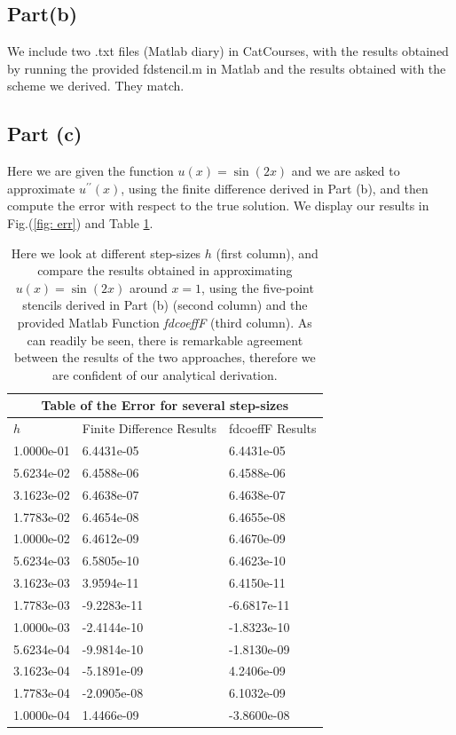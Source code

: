 \documentclass[aps,prl,preprint,groupedaddress]{revtex4-1}
\begin{document}
\subsection{Part(b)}
We include two .txt files (Matlab diary) in CatCourses, with the results obtained by running the provided fdstencil.m in Matlab and the results obtained with the scheme we derived. They match.
\clearpage
\subsection{Part (c)}
Here we are given the function $u(x)=\sin(2x)$ and we are asked to approximate $u^{\prime\prime}(x)$, using the finite difference derived in Part (b), and then compute the error with respect to the true solution. We display our results in Fig.(\ref{fig: err}) and Table \ref{tab: table1}.
\begin{table}
	\begin{tabular}{ |p{4.1cm}||p{4.1cm}|p{4.1cm}| }
		\hline
		\multicolumn{3}{|c|}{Table of the Error for several step-sizes} \\
		\hline
		$h$ & Finite Difference Results & fdcoeffF Results\\
		\hline
		1.0000e-01  & 6.4431e-05 & 6.4431e-05\\
		5.6234e-02  &  6.4588e-06  &  6.4588e-06\\
		3.1623e-02  &    6.4638e-07  &  6.4638e-07\\
		1.7783e-02  &    6.4654e-08  &  6.4655e-08\\
		1.0000e-02  &    6.4612e-09  &  6.4670e-09\\
		5.6234e-03  &    6.5805e-10  &  6.4623e-10\\
		3.1623e-03  &    3.9594e-11  &  6.4150e-11\\
		1.7783e-03  &   -9.2283e-11  & -6.6817e-11\\
		1.0000e-03  &   -2.4144e-10  & -1.8323e-10\\
		5.6234e-04  &   -9.9814e-10  &  -1.8130e-09\\
		3.1623e-04  &   -5.1891e-09  &  4.2406e-09\\
		1.7783e-04  &   -2.0905e-08  &  6.1032e-09\\
		1.0000e-04  &    1.4466e-09  &  -3.8600e-08\\
		\hline
	\end{tabular}
	\caption{\label{tab: table1} Here we look at different step-sizes $h$ (first column), and compare the results obtained in approximating $u(x)=\sin(2x)$ around $x=1$, using the five-point stencils derived in Part (b) (second column) and the provided Matlab Function \textit{fdcoeffF} (third column). As can readily be seen, there is remarkable agreement between the results of the two approaches, therefore we are confident of our analytical derivation.}
\end{table}
\end{document}
